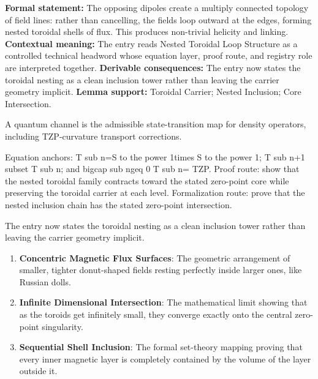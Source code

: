 \begingroup\footnotesize\setlength{\emergencystretch}{3em}\sloppy
\textbf{Formal statement:} The opposing dipoles create a multiply connected topology of field lines: rather than cancelling, the fields loop outward at the edges, forming nested toroidal shells of flux. This produces non-trivial helicity and linking. \textbf{Contextual meaning:} The entry reads Nested Toroidal Loop Structure as a controlled technical headword whose equation layer, proof route, and registry role are interpreted together. \textbf{Derivable consequences:} The entry now states the toroidal nesting as a clean inclusion tower rather than leaving the carrier geometry implicit. \textbf{Lemma support:} Toroidal Carrier; Nested Inclusion; Core Intersection.\par
\endgroup

A quantum channel is the admissible state-transition map for density operators, including TZP-curvature transport corrections.

Equation anchors: T sub n=S to the power 1times S to the power 1; T sub n+1 subset T sub n; and bigcap sub ngeq 0 T sub n= TZP. Proof route: show that the nested toroidal family contracts toward the stated zero-point core while preserving the toroidal carrier at each level. Formalization route: prove that the nested inclusion chain has the stated zero-point intersection.

The entry now states the toroidal nesting as a clean inclusion tower rather than leaving the carrier geometry implicit.
\endgroup

\begin{enumerate}[leftmargin=1.6em,itemsep=6pt,topsep=4pt]
\item \textbf{Concentric Magnetic Flux Surfaces}: The geometric arrangement of smaller, tighter donut-shaped fields resting perfectly inside larger ones, like Russian dolls.
\item \textbf{Infinite Dimensional Intersection}: The mathematical limit showing that as the toroids get infinitely small, they converge exactly onto the central zero-point singularity.
\item \textbf{Sequential Shell Inclusion}: The formal set-theory mapping proving that every inner magnetic layer is completely contained by the volume of the layer outside it.
\end{enumerate}

